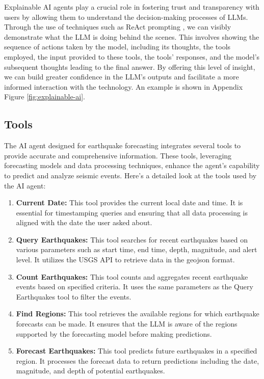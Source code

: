 Explainable AI agents play a crucial role in fostering trust and
transparency with users by allowing them to understand the
decision-making processes of \ac{LLM}s. Through the use of
techniques such as ReAct prompting \parencite{yao2023reactsynergizingreasoningacting},
we can visibly demonstrate what the \ac{LLM} is doing behind the scenes. This
involves showing the sequence of actions taken by the model, including
its thoughts, the tools employed, the input provided to these tools,
the tools' responses, and the model's subsequent thoughts leading to
the final answer. By offering this level of insight, we can build
greater confidence in the \ac{LLM}'s outputs and facilitate a more
informed interaction with the technology. An example is shown in Appendix Figure
\ref{fig:explainable-ai}.

\subsection{Tools}

The AI agent designed for earthquake forecasting integrates several tools
to provide accurate and comprehensive information. These tools, leveraging
forecasting models and data processing techniques, enhance the agent's
capability to predict and analyze seismic events. Here’s a detailed
look at the tools used by the AI agent:

\begin{enumerate}
  \item \textbf{Current Date:} This tool provides the current
        local date and time. It is essential for timestamping queries
        and ensuring that all data processing is aligned with the
        date the user asked about.
  \item \textbf{Query Earthquakes:} This tool searches for
        recent earthquakes based on various parameters such as start
        time, end time, depth, magnitude, and alert level. It utilizes
        the \ac{USGS} API to retrieve data in the
        geojson format.
  \item \textbf{Count Earthquakes:} This tool counts and aggregates
        recent earthquake events based on specified criteria. It uses the
        same parameters as the Query Earthquakes tool to filter the events.
  \item \textbf{Find Regions:} This tool retrieves the available
        regions for which earthquake forecasts can be made. It ensures
        that the \ac{LLM} is aware of the regions supported by the forecasting
        model before making predictions.
  \item \textbf{Forecast Earthquakes:} This tool predicts future
        earthquakes in a specified region. It processes the forecast data
        to return predictions including the date, magnitude, and depth of
        potential earthquakes.
\end{enumerate}


